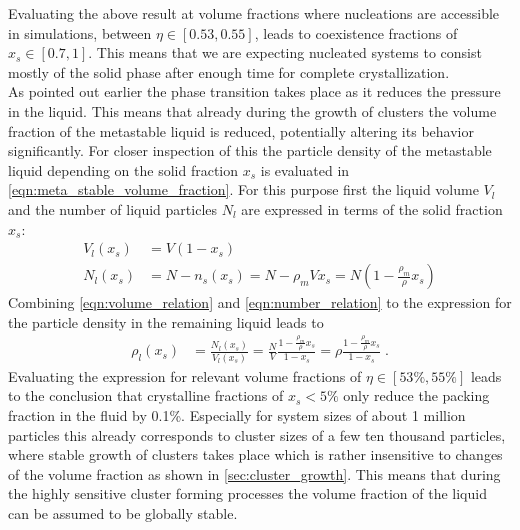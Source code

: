 Evaluating the above result at volume fractions where nucleations are accessible in simulations, between $\eta \in [0.53,0.55]$, leads to coexistence fractions of $x_s \in [0.7,1]$. This means that we are expecting nucleated systems to consist mostly of the solid phase after enough time for complete crystallization.\\

As pointed out earlier the phase transition takes place as it reduces the pressure in the liquid. This means that already during the growth of clusters the volume fraction of the metastable liquid is reduced, potentially altering its behavior significantly. For closer inspection of this the particle density of the metastable liquid depending on the solid fraction $x_s$ is evaluated in \autoref{eqn:meta_stable_volume_fraction}. For this purpose first the liquid volume $V_l$ and the number of liquid particles $N_l$ are expressed in terms of the solid fraction $x_s$:
\begin{align}
\label{eqn:volume_relation}
V_l(x_s) & = V(1-x_s)\\
\label{eqn:number_relation}
N_l(x_s) & = N-n_s(x_s) = N - \rho_m V x_s = N(1-\frac{\rho_m}{\rho}x_s)
\end{align}
Combining \autoref{eqn:volume_relation} and \autoref{eqn:number_relation} to the expression for the particle density in the remaining liquid leads to
\begin{align}
\label{eqn:meta_stable_volume_fraction}
\rho_l(x_s) &= \frac{N_l (x_s) }{ V_l(x_s) } = \frac{N}{V} \frac{1-\frac{\rho_m}{\rho}x_s}{1-x_s} = \rho \frac{1-\frac{\rho_m}{\rho}x_s}{1-x_s} \; \text{.}
\end{align}
Evaluating the expression for relevant volume fractions of $\eta \in [53\%, 55\%]$ leads to the conclusion that crystalline fractions of $x_s < 5\%$ only reduce the packing fraction in the fluid by 0.1\%. Especially for system sizes of about 1 million particles this already corresponds to cluster sizes of a few ten thousand particles, where stable growth of clusters takes place which is rather insensitive to changes of the volume fraction as shown in \autoref{sec:cluster_growth}. This means that during the highly sensitive cluster forming processes the volume fraction of the liquid can be assumed to be globally stable.\\ 

